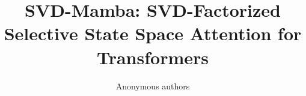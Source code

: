\title{\textbf{SVD-Mamba: SVD-Factorized Selective State Space Attention for Transformers}}

\author{Anonymous authors}
